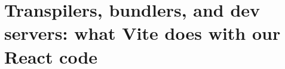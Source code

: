 \chapter{Transpilers, bundlers, and dev servers: what Vite does with our React code}
\label{ch:transpilers-bundlers-and-dev-servers}

